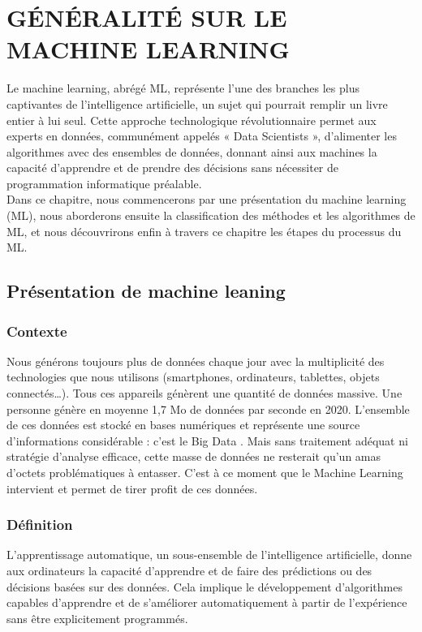 \chapter{GÉNÉRALITÉ SUR LE MACHINE LEARNING}
\begin{spacing}{1.2}
\minitoc
\thispagestyle{MyStyle}
\end{spacing}
\newpage

Le machine learning, abrégé ML, représente l’une des branches les plus captivantes de l’intelligence artificielle, un sujet qui pourrait remplir un livre entier à lui seul. Cette approche technologique révolutionnaire permet aux experts en données, communément appelés « Data Scientists », d’alimenter les algorithmes avec des ensembles de données, donnant ainsi aux machines la capacité d’apprendre et de prendre des décisions sans nécessiter de programmation informatique préalable.
\\
Dans ce chapitre, nous commencerons par une présentation du machine learning (ML), nous aborderons ensuite la classification des méthodes et les algorithmes de ML, et nous découvrirons enfin à travers ce chapitre les étapes du processus du ML.

\section{Présentation de machine leaning}

\subsection{Contexte}
Nous générons toujours plus de données chaque jour avec la multiplicité des technologies que nous utilisons 
(smartphones, ordinateurs, tablettes, objets connectés…). Tous ces appareils génèrent une quantité de données massive. Une personne génère en moyenne 1,7 Mo de 
données par seconde en 2020. L’ensemble de ces données est stocké en bases numériques et représente une source d’informations considérable : c’est le Big Data \cite{Azencott_chloe}. 
Mais sans traitement adéquat ni stratégie d’analyse efficace, cette masse de données ne resterait qu’un amas d’octets problématiques à entasser. C’est à ce moment 
que le Machine Learning intervient et permet de tirer profit de ces données.

\subsection{Définition}
L'apprentissage automatique, un sous-ensemble de l'intelligence artificielle, donne aux ordinateurs la capacité d'apprendre et de faire des prédictions ou des décisions basées sur des données. Cela implique le développement d’algorithmes capables d’apprendre et de s’améliorer automatiquement à partir de l’expérience sans être explicitement programmés. 

